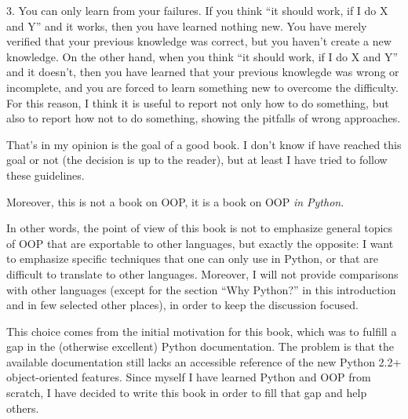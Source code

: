 \documentclass[10pt,english]{article}
\begin{document}
3. You can only learn from your failures. If you think ``it should work, if I do
X and Y'' and it works, then you have learned nothing new. 
You have merely verified
that your previous knowledge was correct, but you haven't create a new
knowledge. On the other hand, when you think ``it should work, if I do
X and Y'' and it doesn't, then you have learned that your previous knowlegde
was wrong or incomplete, and you are forced to learn something new to
overcome the difficulty. For this reason, I think it is useful to report
not only how to do something, but also to report how not to do something, 
showing the pitfalls of wrong approaches.

That's in my opinion is the goal of a good book. I don't know if have
reached this goal or not (the decision is up to the reader), but at least
I have tried to follow these guidelines.

Moreover, this is not a book on OOP, 
it is a book on OOP \emph{in Python}.

In other words, the point of view of this book is not 
to emphasize general topics of OOP that are exportable to other languages, 
but exactly the opposite: I want to emphasize specific techniques that one
can only use in Python, or that are difficult to translate to other 
languages. Moreover, I will not provide comparisons with other 
languages (except for the section ``Why Python?'' in this introduction and
in few selected other places), 
in order to keep the discussion focused.

This choice comes from the initial motivation for this book, which was 
to fulfill a gap in the (otherwise excellent) Python documentation. 
The problem is that the available documentation still lacks an accessible 
reference of the new Python 2.2+ object-oriented features.
Since myself I have learned Python and OOP from scratch, 
I have decided to write this book in order to fill that gap and
help others.
\end{document}
